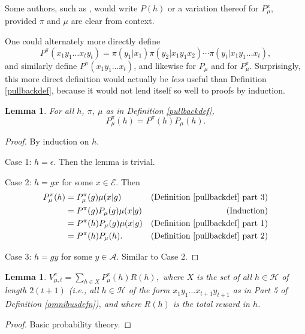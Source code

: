 \documentclass[twoside]{article}
\newtheorem{lemma}[theorem]{Lemma}
\begin{document}
Some authors, such as \cite{hutter2009discrete}, would write $P(h)$ or a variation thereof
for $P^\pi_\mu$, provided $\pi$ and $\mu$ are clear from context.

One could alternately more directly define
\[
    P^\pi(x_1y_1\ldots x_ty_t)
    = \pi(y_1|x_1)\pi(y_2|x_1y_1x_2)\cdots \pi(y_t|x_1y_1\ldots x_t),
\]
and similarly define $P^\pi(x_1y_1\ldots x_t)$,
and likewise for $P_\mu$ and for $P^\pi_\mu$. Surprisingly, this more
direct definition would actually be \emph{less} useful than
Definition \ref{pullbackdef}, because it would not lend itself so well
to proofs by induction.

\begin{lemma}
\label{factorizationlemma}
    For all $h$, $\pi$, $\mu$ as in Definition \ref{pullbackdef},
    \[
        P^\pi_\mu(h) = P^\pi(h)P_\mu(h).
    \]
\end{lemma}

\begin{proof}
    By induction on $h$.

    Case 1: $h=\epsilon$. Then the lemma is trivial.

    Case 2: $h=gx$ for some $x\in\mathcal E$.
        Then
        \begin{align*}
            P^\pi_\mu(h)
                &= P^\pi_\mu(g)\mu(x|g)
                    &\mbox{(Definition \ref{pullbackdef} part 3)}\\
                &= P^\pi(g)P_\mu(g)\mu(x|g)
                    &\mbox{(Induction)}\\
                &= P^\pi(h)P_\mu(g)\mu(x|g)
                    &\mbox{(Definition \ref{pullbackdef} part 1)}\\
                &= P^\pi(h)P_\mu(h).
                    &\mbox{(Definition \ref{pullbackdef} part 2)}
        \end{align*}

    Case 3: $h=gy$ for some $y\in\mathcal A$.
        Similar to Case 2.
\end{proof}

\begin{lemma}
\label{basicprobabilitylemma}
    $V^\pi_{\mu,t}=\sum_{h\in X}P^\pi_\mu(h)R(h),$
    where $X$ is the set of all $h\in\mathcal H$
    of length $2(t+1)$ (i.e., all $h\in\mathcal H$ of the form
    $x_1y_1\ldots x_{t+1}y_{t+1}$
    as in Part 5 of Definition \ref{omnibusdefn}),
    and where $R(h)$ is the total reward in $h$.
\end{lemma}

\begin{proof}
    Basic probability theory.
\end{proof}
\end{document}
